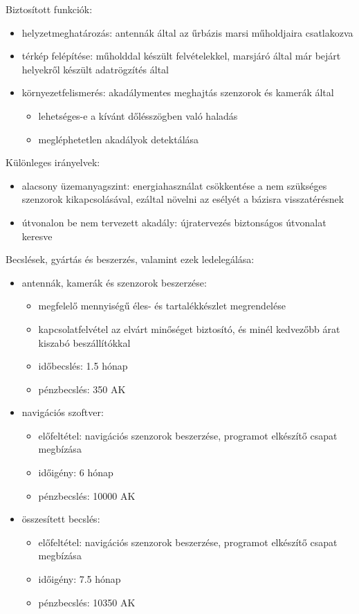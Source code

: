 \documentclass[12pt]{report}
\begin{document}
Biztosított funkciók:
\begin{itemize}
  \item helyzetmeghatározás: antennák által az űrbázis marsi műholdjaira csatlakozva
  \item térkép felépítése: műholddal készült felvételekkel, marsjáró által már bejárt helyekről készült adatrögzítés által
  \item környezetfelismerés: akadálymentes meghajtás szenzorok és kamerák által \begin {itemize}
      \item lehetséges-e a kívánt dőlésszögben való haladás
      \item megléphetetlen akadályok detektálása
    \end{itemize}
\end{itemize}

Különleges irányelvek:
\begin{itemize}
  \item alacsony üzemanyagszint: energiahasználat csökkentése a nem szükséges szenzorok kikapcsolásával, ezáltal növelni az esélyét a bázisra visszatérésnek
  \item útvonalon be nem tervezett akadály: újratervezés biztonságos útvonalat keresve
\end{itemize}

Becslések, gyártás és beszerzés, valamint ezek ledelegálása:
\begin{itemize}
  \item antennák, kamerák és szenzorok beszerzése: \begin{itemize}
      \item megfelelő mennyiségű éles- és tartalékkészlet megrendelése
      \item kapcsolatfelvétel az elvárt minőséget biztosító, és minél kedvezőbb árat kiszabó beszállítókkal
      \item időbecslés: 1.5 hónap
      \item pénzbecslés: 350 AK
    \end{itemize}
  \item navigációs szoftver: \begin{itemize}
      \item előfeltétel: navigációs szenzorok beszerzése, programot elkészítő csapat megbízása
      \item időigény: 6 hónap
      \item pénzbecslés: 10000 AK
    \end{itemize}
  \item összesített becslés: \begin{itemize}
      \item előfeltétel: navigációs szenzorok beszerzése, programot elkészítő csapat megbízása
      \item időigény: 7.5 hónap
      \item pénzbecslés: 10350 AK
    \end{itemize}
\end{itemize}
\end{document}
